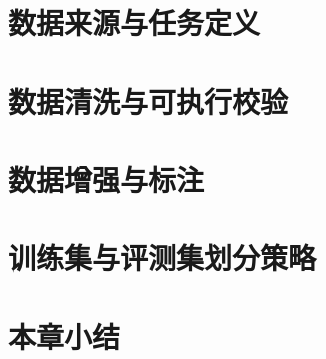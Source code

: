 
\section{数据来源与任务定义}


\section{数据清洗与可执行校验}


\section{数据增强与标注}


\section{训练集与评测集划分策略}


\section{本章小结}
